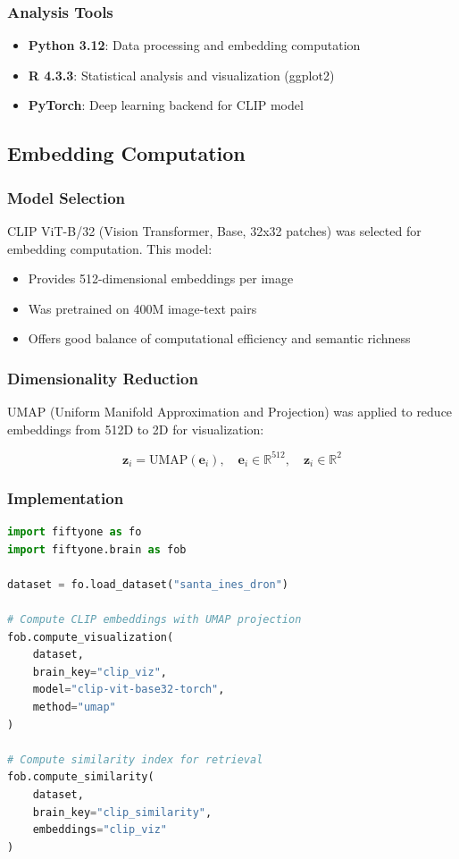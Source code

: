 \subsubsection{Analysis Tools}
\begin{itemize}
    \item \textbf{Python 3.12}: Data processing and embedding computation
    \item \textbf{R 4.3.3}: Statistical analysis and visualization (ggplot2)
    \item \textbf{PyTorch}: Deep learning backend for CLIP model
\end{itemize}

\subsection{Embedding Computation}

\subsubsection{Model Selection}
CLIP ViT-B/32 (Vision Transformer, Base, 32x32 patches) was selected for embedding computation. This model:
\begin{itemize}
    \item Provides 512-dimensional embeddings per image
    \item Was pretrained on 400M image-text pairs
    \item Offers good balance of computational efficiency and semantic richness
\end{itemize}

\subsubsection{Dimensionality Reduction}
UMAP (Uniform Manifold Approximation and Projection) was applied to reduce embeddings from 512D to 2D for visualization:

\begin{equation}
    \mathbf{z}_i = \text{UMAP}(\mathbf{e}_i), \quad \mathbf{e}_i \in \mathbb{R}^{512}, \quad \mathbf{z}_i \in \mathbb{R}^{2}
\end{equation}


\subsubsection{Implementation}
\begin{lstlisting}[language=Python, caption=Embedding computation with FiftyOne]
import fiftyone as fo
import fiftyone.brain as fob

dataset = fo.load_dataset("santa_ines_dron")

# Compute CLIP embeddings with UMAP projection
fob.compute_visualization(
    dataset,
    brain_key="clip_viz",
    model="clip-vit-base32-torch",
    method="umap"
)

# Compute similarity index for retrieval
fob.compute_similarity(
    dataset,
    brain_key="clip_similarity",
    embeddings="clip_viz"
)
\end{lstlisting}

